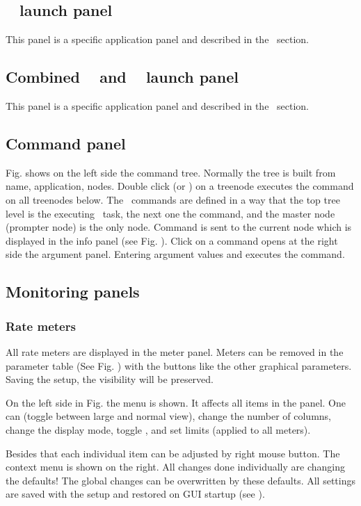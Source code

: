 {\subsection{\mbs~ launch panel}
This panel is a specific application panel and described in the \mbs\ section.
\subsection{Combined \dabc~ and \mbs~ launch panel}
This panel is a specific application panel and described in the \mbs\ section.
\subsection{Command panel}
Fig.  shows
on the left side the command tree. Normally the tree is built
from name, application, nodes. Double click (or ) on a treenode
executes the command on all treenodes below. The \mbs\ commands
are defined in a way that the top tree level is the executing \mbs\ task,
the next one the command, and the master node (prompter node) is the only node.
Command is sent to the current node which is displayed in the info panel
(see Fig. ).
Click on a command opens at the right side the argument panel.
Entering argument values and  executes the command.
\subsection{Monitoring panels}
\subsubsection{Rate meters}
All rate meters are displayed in the meter panel. Meters can be removed
in the parameter table (See Fig. ) 
with the  buttons like the other graphical parameters.
Saving the setup, the visibility will be preserved.

On the left side in Fig.  the 
menu is shown. It affects all items in the panel. One can 
(toggle between large and normal view), change the number of
columns, change the display mode, toggle , and set limits
(applied to all meters). 

Besides that each individual item can be
adjusted by right mouse button. The context menu is shown on the right.
All changes done individually are changing the defaults!
The global changes can be overwritten by these defaults.
All settings are saved with the setup and restored on GUI startup
(see ).
}
